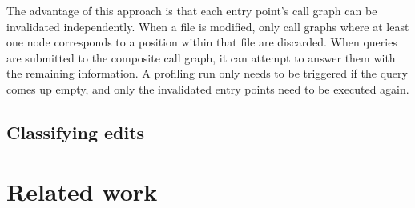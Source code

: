 The advantage of this approach is that each entry point's call graph can be
invalidated independently. When a file is modified, only call graphs where
at least one node corresponds to a position within that file are discarded.
When queries are submitted to the composite call graph, it can attempt to
answer them with the remaining information. A profiling run only needs to be
triggered if the query comes up empty, and only the invalidated entry points
need to be executed again.

\subsection{Classifying edits}


\section{Related work}

